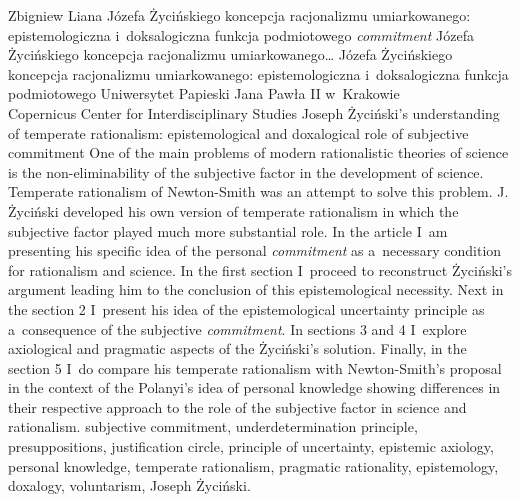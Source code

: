 \begin{artplenv}{Zbigniew Liana}
	{Józefa Życińskiego koncepcja racjonalizmu umiarkowanego: epistemologiczna i~doksalogiczna funkcja podmiotowego \textit{commitment}}
	{Józefa Życińskiego koncepcja racjonalizmu umiarkowanego\ldots}
	{Józefa Życińskiego koncepcja racjonalizmu umiarkowanego: epistemologiczna i~doksalogiczna funkcja podmiotowego }
	{Uniwersytet Papieski Jana Pawła II w~Krakowie\\	
	Copernicus Center for Interdisciplinary Studies}
	{Joseph Życiński's understanding of temperate rationalism: epistemological and doxalogical role of subjective commitment}
	{One of the main problems of modern rationalistic theories of science is the non-eliminability of the subjective factor in the development of science. Temperate rationalism of Newton-Smith was an attempt to solve this problem. J. Życiński developed his own version of temperate rationalism in which the subjective factor played much more substantial role. In the article I~am presenting his specific idea of the personal \textit{commitment} as a~necessary condition for rationalism and science. In the first section I~proceed to reconstruct Życiński's argument leading him to the conclusion of this epistemological necessity. Next in the section 2 I~present his idea of the epistemological uncertainty principle as a~consequence of the subjective \textit{commitment}. In sections 3 and 4 I~explore axiological and pragmatic aspects of the Życiński's solution. Finally, in the section 5 I~do compare his temperate rationalism with Newton-Smith's proposal in the context of the Polanyi's idea of personal knowledge showing differences in their respective approach to the role of the subjective factor in science and rationalism.}
	{subjective commitment, underdetermination principle, presuppositions, justification circle, principle of uncertainty, epistemic axiology, personal knowledge, temperate rationalism, pragmatic rationality, epistemology, doxalogy, voluntarism, Joseph Życiński.}



\end{artplenv}
